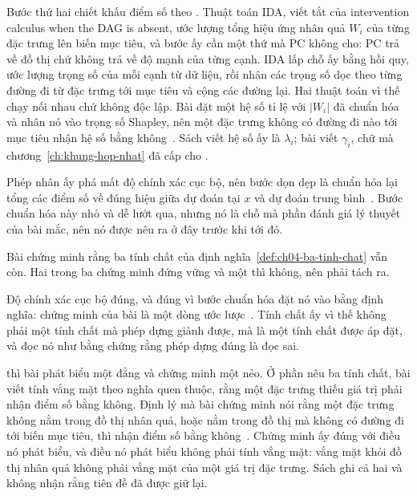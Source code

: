 %
Bước thứ hai chiết khấu điểm số theo
. Thuật toán IDA, viết tắt
của intervention calculus when the DAG is absent, ước lượng tổng hiệu ứng nhân
quả $W_i$ của từng đặc trưng lên biến mục tiêu, và bước ấy cần một thứ mà PC
không cho: PC trả về đồ thị chứ không trả về độ mạnh của từng cạnh. IDA lấp chỗ
ấy bằng hồi quy, ước lượng trọng số của mỗi cạnh từ dữ liệu, rồi nhân các trọng
số dọc theo từng đường đi từ đặc trưng tới mục tiêu và cộng các đường lại. Hai
thuật toán vì thế chạy nối nhau chứ không độc lập. Bài đặt một hệ số tỉ lệ với
$\lvert W_i\rvert$ đã chuẩn hóa và nhân nó vào trọng số Shapley, nên một đặc
trưng không có đường đi nào tới mục tiêu nhận hệ số bằng
không~\autocite{p29causalshap}. Sách viết hệ số ấy là $\lambda_i$; bài viết
$\gamma_i$, chữ mà chương~\ref{ch:khung-hop-nhat} đã cấp cho .

Phép nhân ấy phá mất độ chính xác cục bộ, nên bước dọn dẹp là chuẩn hóa lại
tổng các điểm số về đúng hiệu giữa dự đoán tại $x$ và dự đoán trung
bình~\autocite{p29causalshap}. Bước chuẩn hóa này nhỏ và dễ lướt qua, nhưng nó
là chỗ mà phần đánh giá lý thuyết của bài mắc, nên nó được nêu ra ở đây trước
khi tới đó.

%
Bài chứng minh rằng ba tính chất của định nghĩa~\ref{def:ch04-ba-tinh-chat} vẫn
còn. Hai trong ba chứng minh đứng vững và một thì không, nên phải tách ra.

Độ chính xác cục bộ đúng, và đúng vì bước chuẩn hóa đặt nó vào bằng định nghĩa:
chứng minh của bài là một dòng ước lược~\autocite{p29causalshap}. Tính chất ấy
vì thế không phải một tính chất mà phép dựng giành được, mà là một tính chất
được áp đặt, và đọc nó như bằng chứng rằng phép dựng đúng là đọc sai.

%
 thì bài phát biểu một đằng và chứng minh một nẻo. Ở phần nêu ba
tính chất, bài viết tính vắng mặt theo nghĩa quen thuộc, rằng một đặc trưng
thiếu giá trị phải nhận điểm số bằng không. Định lý mà bài chứng minh nói rằng
một đặc trưng không nằm trong đồ thị nhân quả, hoặc nằm trong đồ thị mà không
có đường đi tới biến mục tiêu, thì nhận điểm số bằng
không~\autocite{p29causalshap}. Chứng minh ấy đúng với điều nó phát biểu, và
điều nó phát biểu không phải tính vắng mặt: vắng mặt khỏi đồ thị nhân quả không
phải vắng mặt của một giá trị đặc trưng. Sách ghi cả hai và không nhận rằng
tiên đề đã được giữ lại.

